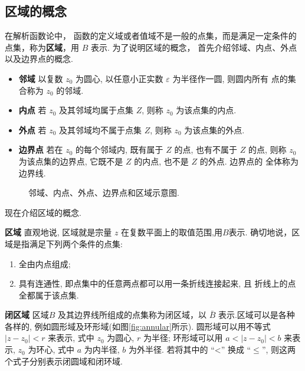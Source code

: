 



\subsection{区域的概念}
\label{sub:domain}
在解析函数论中， 函数的定义域或者值域不是一般的点集，而是满足一定条件的点集，称为{\bf 区域}，用 $B$ 表示.
为了说明区域的概念， 首先介绍邻域、内点、外点以及边界点的概念.

\begin{itemize}
\item {\bf 邻域} \quad 以复数 $z_0$ 为圆心, 以任意小正实数 $\varepsilon$ 为半径作一圆, 则圆内所有 点的集合称为 $z_0$ 的邻域.
\item {\bf 内点} \quad 若 $z_0$ 及其邻域均属于点集 $Z$, 则称 $z_0$ 为该点集的内点.
\item {\bf 外点} \quad 若 $z_0$ 及其邻域均不属于点集 $Z$, 则称 $z_0$ 为该点集的外点.
\item {\bf 边界点}  \quad 若在 $z_0$ 的每个邻域内, 既有属于 $Z$ 的点, 也有不属于 $Z$ 的点, 
        则称 $z_0$ 为该点集的边界点, 它既不是 $Z$ 的内点, 也不是 $Z$ 的外点. 边界点的 全体称为边界线.
\end{itemize}

\begin{figure}
    \centering
    
    \caption{邻域、内点、外点、边界点和区域示意图.}
    \label{fig:region}
\end{figure}

现在介绍区域的概念. 

\textbf{区域} \quad 直观地说,  区域就是宗量 $z$ 在复数平面上的取值范围,用$B$表示. 
确切地说，区域是指满足下列两个条件的点集:
    \begin{enumerate}
        \item 全由内点组成;
        \item 具有连通性, 即点集中的任意两点都可以用一条折线连接起来, 且 折线上的点全都属于该点集.
    \end{enumerate}

\textbf{闭区域} \quad 区域$B$ 及其边界线所组成的点集称为闭区域，以 $\bar{B}$ 表示.区域可以是各种各样的, 例如圆形域及环形域(如图\ref{fig:annular}所示). 
圆形域可以用不等式 $\left|z-z_0\right|<r$ 来表示, 式中 $z_0$ 为圆心, $r$ 为半径; 
环形域可以用 $a<\left|z-z_0\right|<b$ 来表示, $z_0$ 为环心, 式中 $a$ 为内半径, $b$ 为外半径.
 若将其中的 “<” 换成 $“ \leqslant ”$, 则这两个式子分别表示闭圆域和闭环域.

